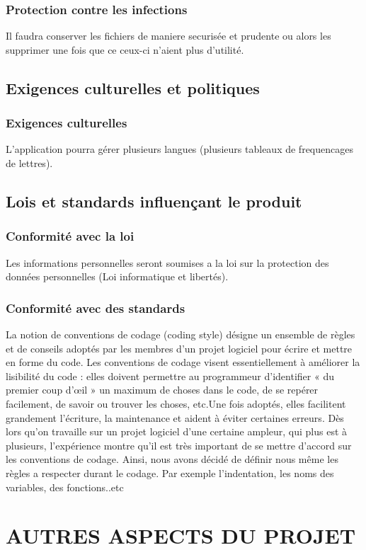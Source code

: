\documentclass[a4]{article}
\begin{document}
			\subsubsection {Protection contre les infections}
				Il faudra conserver les fichiers de maniere securisée et prudente ou alors les supprimer une 					fois que ce ceux-ci n'aient plus d'utilité.
		\subsection{Exigences culturelles et politiques}
			\subsubsection {Exigences culturelles}
				L'application pourra gérer plusieurs langues (plusieurs tableaux de frequencages de lettres).
		\subsection{Lois et standards influençant le produit}
			\subsubsection {Conformité avec la loi}
				Les informations personnelles seront soumises a la loi sur la protection des données
				personnelles (Loi informatique et libertés).
			\subsubsection {Conformité avec des standards}
La notion de conventions de codage (coding style) désigne un ensemble de règles et de conseils 
adoptés par les membres d’un projet logiciel pour écrire et mettre en forme du code.
Les conventions de codage visent essentiellement à améliorer la lisibilité du code : elles doivent 
permettre au programmeur d’identifier « du premier coup d’œil » un maximum de choses dans 
le  code, de se repérer facilement, de savoir ou trouver les choses, etc.Une fois adoptés, elles
facilitent grandement l’écriture, la maintenance et aident à éviter certaines erreurs.
Dès lors qu’on travaille sur un projet logiciel d’une certaine ampleur, qui plus est à
plusieurs, l’expérience montre qu’il est très important de se mettre d’accord sur les
conventions de codage. Ainsi, nous avons décidé de définir nous même les règles a respecter durant le codage. Par exemple l'indentation, les noms des variables, des fonctions..etc
\section{AUTRES ASPECTS DU PROJET}
\end{document}
